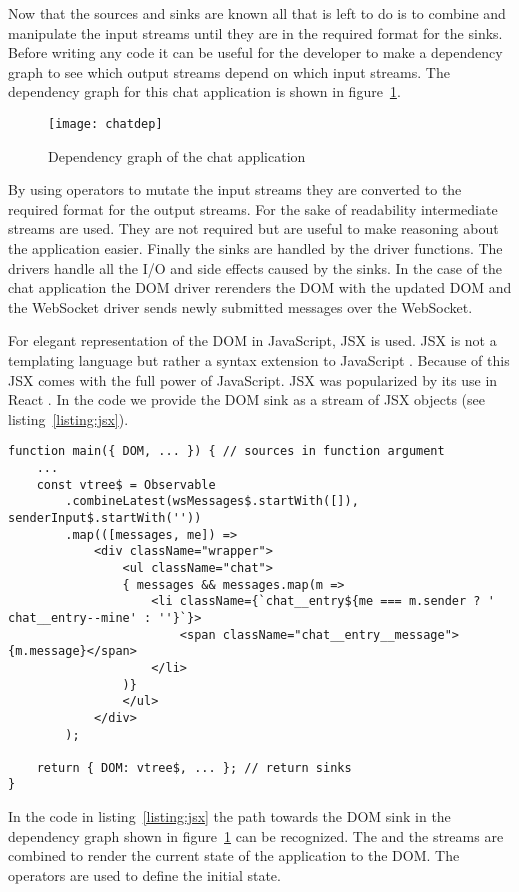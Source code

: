 Now that the sources and sinks are known all that is left to do is to combine and manipulate the input streams until they are in the required format for the sinks. Before writing any code it can be useful for the developer to make a dependency graph to see which output streams depend on which input streams. The dependency graph for this chat application is shown in figure~\ref{figure:chat-dep}.

\begin{figure}[H]
	\centering
	\texttt{[image: chatdep]}
	\caption{Dependency graph of the chat application}
	\label{figure:chat-dep}
\end{figure}

By using operators to mutate the input streams they are converted to the required format for the output streams. For the sake of readability intermediate streams are used. They are not required but are useful to make reasoning about the application easier. Finally the sinks are handled by the driver functions. The drivers handle all the I/O and side effects caused by the sinks. In the case of the chat application the DOM driver rerenders the DOM with the updated DOM and the WebSocket driver sends newly submitted messages over the WebSocket.

For elegant representation of the DOM in JavaScript, JSX is used. JSX is not a templating language but rather a syntax extension to JavaScript \cite{jsx}. Because of this JSX comes with the full power of JavaScript. JSX was popularized by its use in React \cite{jsx}. In the code we provide the DOM sink as a stream of JSX objects (see listing~\ref{listing:jsx}).

\begin{lstlisting}[caption=Using JSX to define the DOM,label=listing:jsx]
function main({ DOM, ... }) { // sources in function argument
	...
	const vtree$ = Observable
		.combineLatest(wsMessages$.startWith([]), senderInput$.startWith(''))
		.map(([messages, me]) =>
			<div className="wrapper">
				<ul className="chat">
				{ messages && messages.map(m =>
					<li className={`chat__entry${me === m.sender ? ' chat__entry--mine' : ''}`}>
						<span className="chat__entry__message">{m.message}</span>
					</li>
				)}
				</ul>
			</div>
		);
		
	return { DOM: vtree$, ... }; // return sinks
}
\end{lstlisting}

In the code in listing~\ref{listing:jsx} the path towards the DOM sink in the dependency graph shown in figure~\ref{figure:chat-dep} can be recognized. The  and the  streams are combined to render the current state of the application to the DOM. The  operators are used to define the initial state.

